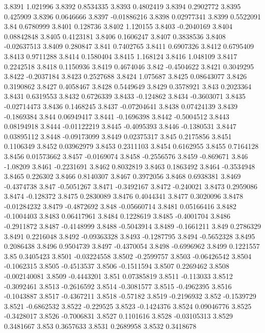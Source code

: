 3.8391  1.021996
3.8392  0.8534335
3.8393  0.4802419
3.8394  0.2902772
3.8395  0.425909
3.8396  0.0646666
3.8397  -0.01886216
3.8398  0.02977341
3.8399  0.5522091
3.84  0.6780999
3.8401  0.128736
3.8402  1.120155
3.8403  -0.2040169
3.8404  0.08842848
3.8405  0.4123181
3.8406  0.1606247
3.8407  0.3838536
3.8408  -0.02637513
3.8409  0.280847
3.841  0.7402765
3.8411  0.6907326
3.8412  0.6795409
3.8413  0.9711288
3.8414  0.1580404
3.8415  1.168124
3.8416  1.048109
3.8417  0.2242518
3.8418  0.1150936
3.8419  0.4674046
3.842  -0.4504622
3.8421  0.3049295
3.8422  -0.2037184
3.8423  0.2527688
3.8424  1.075687
3.8425  0.08643077
3.8426  0.3190862
3.8427  0.4058467
3.8428  0.5449649
3.8429  0.3578921
3.843  0.2023364
3.8431  0.6319553
3.8432  0.6726339
3.8433  -0.124862
3.8434  -0.3603071
3.8435  -0.02714473
3.8436  0.1468245
3.8437  -0.07204641
3.8438  0.07424139
3.8439  -0.1869384
3.844  0.06949417
3.8441  -0.1696398
3.8442  -0.5004512
3.8443  0.08194918
3.8444  -0.01122219
3.8445  -0.4095393
3.8446  -0.1380531
3.8447  0.03895112
3.8448  -0.09173099
3.8449  0.02375317
3.845  0.2175856
3.8451  0.1106349
3.8452  0.03962979
3.8453  0.2311103
3.8454  0.6162955
3.8455  0.7164128
3.8456  0.01573662
3.8457  -0.0169074
3.8458  -0.2556576
3.8459  -0.869671
3.846  -1.08209
3.8461  -0.2231691
3.8462  0.8032819
3.8463  0.1863492
3.8464  -0.3534948
3.8465  0.226302
3.8466  0.8140307
3.8467  0.3972056
3.8468  0.6938381
3.8469  -0.4374738
3.847  -0.5051267
3.8471  -0.3492167
3.8472  -0.240021
3.8473  0.2959086
3.8474  -0.128372
3.8475  0.2830089
3.8476  0.4044341
3.8477  0.3020096
3.8478  -0.01284232
3.8479  -0.4872692
3.848  -0.05660714
3.8481  0.05166416
3.8482  -0.1004403
3.8483  0.06417961
3.8484  0.1228619
3.8485  -0.4001704
3.8486  -0.2911872
3.8487  -0.4148999
3.8488  -0.5043914
3.8489  -0.1661211
3.849  0.2786329
3.8491  0.2216048
3.8492  -0.09363328
3.8493  -0.1287795
3.8494  -0.5652328
3.8495  0.2086438
3.8496  0.9504739
3.8497  -0.4370054
3.8498  -0.6996962
3.8499  0.1221557
3.85  0.3405423
3.8501  -0.03224558
3.8502  -0.2599757
3.8503  -0.06426542
3.8504  -0.1062315
3.8505  -0.4513537
3.8506  -0.1511594
3.8507  0.2269462
3.8508  -0.002140081
3.8509  -0.4443201
3.851  0.07385819
3.8511  -0.113033
3.8512  -0.3092461
3.8513  -0.2616592
3.8514  -0.3081577
3.8515  -0.4962395
3.8516  -0.1043887
3.8517  -0.4367211
3.8518  -0.57182
3.8519  -0.2196932
3.852  -0.1539729
3.8521  -0.6862532
3.8522  -0.229525
3.8523  -0.1424376
3.8524  0.09046776
3.8525  -0.3428017
3.8526  -0.7006831
3.8527  0.1101616
3.8528  -0.03105313
3.8529  0.3481667
3.853  0.3657633
3.8531  0.2689958
3.8532  0.3418678
